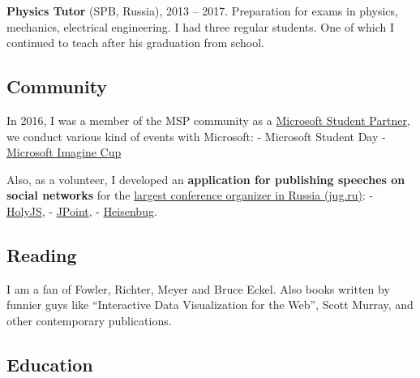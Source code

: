 \documentclass{yb}
\begin{document}
\textbf{Physics Tutor} (SPB, Russia), 2013 -- 2017.
Preparation for exams in physics, mechanics, electrical engineering.
I had three regular students. One of which I continued to teach after his graduation from school.

\subsection*{Community}

In 2016, I was a member of the MSP community as a \href{https://studentambassadors.microsoft.com/en-en}{Microsoft Student Partner}, we conduct various kind of events with Microsoft:
\newline - Microsoft Student Day
\newline - \href{https://imaginecup.microsoft.com/en-us/Events}{Microsoft Imagine Cup}

Also, as a volunteer, I developed an \textbf{application for publishing speeches on social networks} for the \href{https://jugru.org/en/}{largest conference organizer in Russia (jug.ru)}:
\newline - \href{https://holyjs.ru/en/}{HolyJS}, 
\newline - \href{https://jpoint.ru/en/}{JPoint}, 
\newline - \href{https://heisenbug.ru/en/}{Heisenbug}.

\subsection*{Reading}

I am a fan of Fowler, Richter, Meyer and Bruce Eckel. Also books written by funnier guys like “Interactive Data Visualization for the Web”, Scott Murray, and other contemporary publications.

\subsection*{Education}
\end{document}
